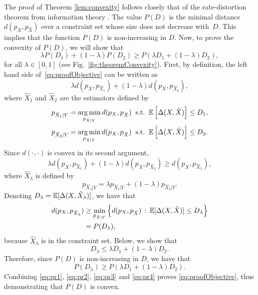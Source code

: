 The proof of Theorem \ref{lem:convexity} follows closely that of the rate-distortion theorem from information theory \cite{cover2012elements}. The value $P(D)$ is the minimal distance $d(p_X,p_{\hat{X}})$ over a constraint set whose size does not decrease with~$D$. This implies that the function $P(D)$ is non-increasing in $D$. Now, to prove the convexity of $P(D)$, we will show that
\begin{equation}\label{eq:proofObjective}
\lambda P(D_{1})+(1-\lambda)P(D_2) \ge  P(\lambda D_{1}+(1-\lambda)D_{2}),
\end{equation}
for all $\lambda \in [0,1]$ (see Fig.~\ref{fig:theoremConvexity}). First, by definition, the left hand side of~\eqref{eq:proofObjective} can be written as
\begin{equation}\label{eq:pr1}
\lambda d(p_{X}, p_{\hat{X}_{1}}) + (1-\lambda)d(p_{X}, p_{\hat{X}_{2}}),
\end{equation}
where $\hat{X}_1$ and $\hat{X}_2$ are the estimators defined by
\begin{align}\label{eq:defX1}
p_{\hat{X}_1 \vert Y} &= \operatorname{\arg\min}_{p_{\hat{X} \vert Y}}\limits d(p_X,p_{\hat{X}})\;\;
\text{s.t.}\;\;  \mathbb{E} \left[ {\Delta(X,\hat{X})} \right] \le D_1,  \\
p_{\hat{X}_2 \vert Y} &= \operatorname{\arg\min}_{p_{\hat{X} \vert Y}}\limits d(p_X,p_{\hat{X}}) \;\;
\text{s.t.}\;\;  \mathbb{E} \left[ {\Delta(X,\hat{X})} \right] \le D_2.
\end{align}
Since $d(\cdot,\cdot)$ is convex in its second argument,
\begin{equation}\label{eq:pr2}
\lambda d(p_{X}, p_{\hat{X}_{1}}) + (1-\lambda)d(p_{X}, p_{\hat{X}_{2}}) \ge d(p_{X}, p_{\hat{X}_{\lambda}}),
\end{equation}
where $\hat{X}_{\lambda}$ is defined by
\begin{equation}\label{eq:define_XhatLambda}
p_{\hat{X}_{\lambda}\vert Y}=\lambda p_{\hat{X}_1\vert Y}+\left(1-\lambda \right)p_{\hat{X}_2\vert Y}.
\end{equation}
Denoting $D_\lambda = \mathbb{E}[\Delta(X,\hat{X}_\lambda)]$, we have that
\begin{align}\label{eq:pr3}
d(p_{X}, p_{\hat{X}_{\lambda}}) &\ge \min_{p_{\hat{X} \vert Y}} \left\{ d(p_X,p_{\hat{X}}) \, : \, \mathbb{E}[\Delta(X,\hat{X})] \le D_\lambda \right\} \nonumber \\
&= P(D_{\lambda}),
\end{align}
because $\hat{X}_{\lambda}$ is in the constraint set. Below, we show that
\begin{equation}\label{eq:pr5}
D_{\lambda} \le \lambda D_1 + (1-\lambda)D_2.
\end{equation}
Therefore, since $P(D)$ is non-increasing in $D$, we have that
\begin{equation}\label{eq:pr4}
P(D_{\lambda}) \ge P(\lambda D_{1}+(1-\lambda)D_2).
\end{equation}
Combining \eqref{eq:pr1}, \eqref{eq:pr2}, \eqref{eq:pr3} and \eqref{eq:pr4} proves \eqref{eq:proofObjective}, thus demonstrating that $P(D)$ is convex.

